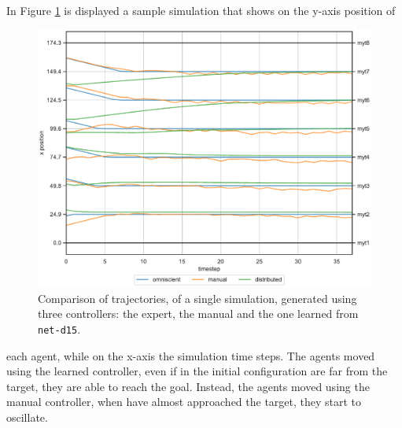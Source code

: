 In Figure \ref{fig:net-d15traj1} is displayed a sample simulation that shows on 
the y-axis position of  
\begin{figure}[H]
	\centering
	\includegraphics[width=.7\textwidth]{contents/images/net-d15/animation-distributed}%
	\caption[Evaluation of the trajectories obtained with 8 agents.]{Comparison of 
	trajectories, of a single simulation, generated using three controllers: the 
	expert, the manual and the one learned from \texttt{net-d15}.}
	\label{fig:net-d15traj1}
\end{figure}

\noindent
each agent, while on the x-axis the simulation time steps.
The agents moved using the learned controller, even if in the initial configuration 
are far from the target, they are able to reach the goal. 
Instead, the agents moved using the manual controller, when have almost 
approached the target, they start to oscillate. 

